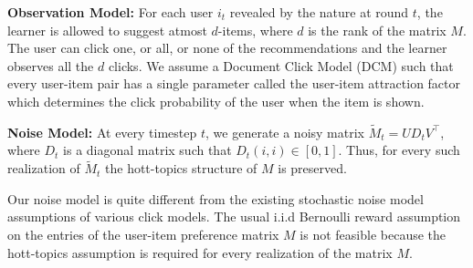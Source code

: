 

\textbf{Observation Model:} For each user $i_t$ revealed by the nature at round $t$, the learner is allowed to suggest atmost $d$-items, where $d$ is the rank of the matrix $M$. The user can click one, or all, or none of the recommendations and the learner observes all the $d$ clicks. We assume a Document Click Model (DCM) \citep{craswell2008experimental} such that every user-item pair has a single parameter called the user-item attraction factor which determines the click probability of the user when the item is shown.  

\textbf{Noise Model:}  At every timestep $t$, we generate a noisy matrix $\tilde{M}_t = UD_t V^{\intercal}$,  where $D_t$ is a diagonal matrix such that $D_t(i,i)\in[0,1]$. Thus, for every such realization of $\tilde{M}_t$  the hott-topics structure of $M$ is preserved. 


\begin{discussion}
Our noise model is quite different from the existing stochastic noise model assumptions of various click models. The usual i.i.d Bernoulli reward assumption on the entries of the user-item preference matrix $M$ is not feasible because the hott-topics assumption is required for every realization of the matrix $M$. 
\end{discussion}

